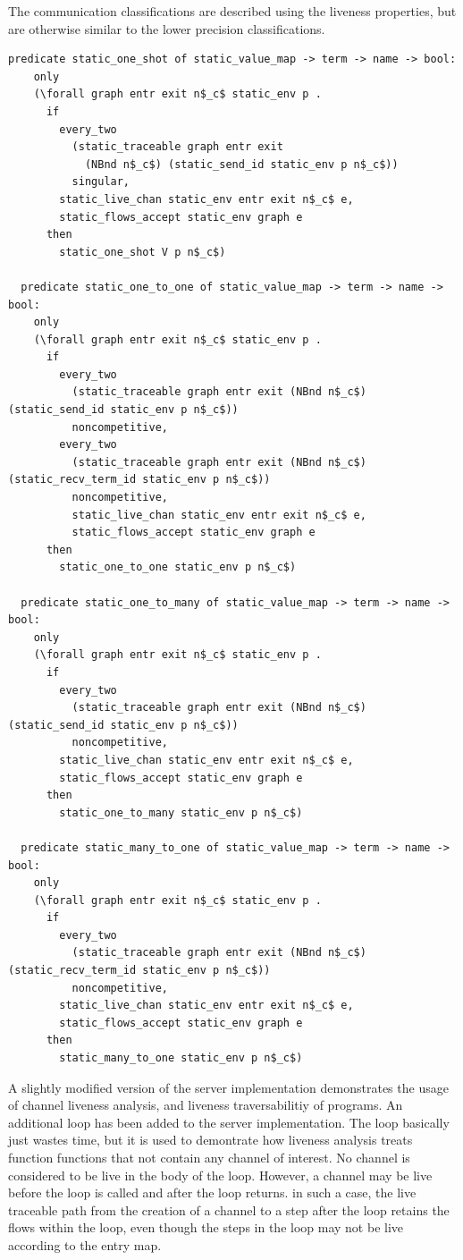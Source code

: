 \documentclass[10pt]{article}
\begin{document}
The communication classifications are described using the liveness properties, but
are otherwise similar to the lower precision classifications.

\begin{lstlisting}[language=logic, mathescape]
  predicate static_one_shot of static_value_map -> term -> name -> bool:
    only
    (\forall graph entr exit n$_c$ static_env p . 
      if
        every_two
          (static_traceable graph entr exit
            (NBnd n$_c$) (static_send_id static_env p n$_c$))
          singular, 
        static_live_chan static_env entr exit n$_c$ e, 
        static_flows_accept static_env graph e
      then
        static_one_shot V p n$_c$)

  predicate static_one_to_one of static_value_map -> term -> name -> bool:
    only
    (\forall graph entr exit n$_c$ static_env p .
      if
        every_two
          (static_traceable graph entr exit (NBnd n$_c$) (static_send_id static_env p n$_c$))
          noncompetitive, 
        every_two
          (static_traceable graph entr exit (NBnd n$_c$) (static_recv_term_id static_env p n$_c$))
          noncompetitive,
          static_live_chan static_env entr exit n$_c$ e,
          static_flows_accept static_env graph e
      then
        static_one_to_one static_env p n$_c$)

  predicate static_one_to_many of static_value_map -> term -> name -> bool:
    only
    (\forall graph entr exit n$_c$ static_env p .
      if
        every_two
          (static_traceable graph entr exit (NBnd n$_c$) (static_send_id static_env p n$_c$))
          noncompetitive,
        static_live_chan static_env entr exit n$_c$ e,
        static_flows_accept static_env graph e
      then
        static_one_to_many static_env p n$_c$)

  predicate static_many_to_one of static_value_map -> term -> name -> bool:
    only
    (\forall graph entr exit n$_c$ static_env p .
      if
        every_two
          (static_traceable graph entr exit (NBnd n$_c$) (static_recv_term_id static_env p n$_c$))
          noncompetitive, 
        static_live_chan static_env entr exit n$_c$ e,
        static_flows_accept static_env graph e
      then
        static_many_to_one static_env p n$_c$)
  \end{lstlisting}


A slightly modified version of the server implementation demonstrates the usage of channel liveness
analysis, and liveness traversabilitiy of programs.  An additional loop has been added to the
server implementation.  The loop basically just wastes time, but it is used to demontrate how
liveness analysis treats function functions that not contain
any channel of interest.  No channel is
considered to be live in the body of the loop.  However, a channel may be live before the loop is
called and after the loop returns.  in such a case, the live traceable path from the creation of a
channel to a step after the loop retains the flows within the loop, even though the steps in
the loop may not be live according to the entry map.
\end{document}
